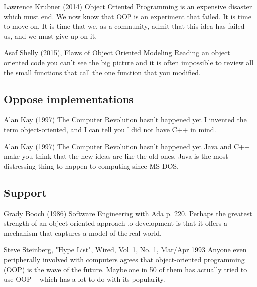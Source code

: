\documentclass[12pt]{book}
\begin{document}
\begin{kodequote}{Lawrence Krubner (2014)}
	Object Oriented Programming is an expensive disaster which must end. 
	We now know that OOP is an experiment that failed. It is time to move on. It is time that we, as a community, admit that this idea has failed us, and we must give up on it.
\end{kodequote}

\begin{kodequote}{Asaf Shelly (2015), Flaws of Object Oriented Modeling}
	Reading an object oriented code you can't see the big picture and it is often impossible to review all the small functions that call the one function that you modified.
\end{kodequote}


\subsection{Oppose implementations}

\begin{kodequote}{Alan Kay (1997) The Computer Revolution hasn't happened yet}
	I invented the term object-oriented, and I can tell you I did not have C++ in mind.
\end{kodequote}

\begin{kodequote}{Alan Kay (1997) The Computer Revolution hasn't happened yet}
	Java and C++ make you think that the new ideas are like the old ones. Java is the most distressing thing to happen to computing since MS-DOS.
\end{kodequote}

\subsection{Support}

\begin{kodequote}{Grady Booch (1986) Software Engineering with Ada p. 220. }
	Perhaps the greatest strength of an object-oriented approach to development is that it offers a mechanism that captures a model of the real world.
\end{kodequote}


\begin{kodequote}{Steve Steinberg, "Hype List", Wired, Vol. 1, No. 1, Mar/Apr 1993}
	Anyone even peripherally involved with computers agrees that object-oriented programming (OOP) is the wave of the future. Maybe one in 50 of them has actually tried to use OOP – which has a lot to do with its popularity.
\end{kodequote}
\end{document}
